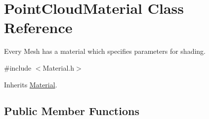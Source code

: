 \hypertarget{class_point_cloud_material}{\section{Point\-Cloud\-Material Class Reference}
\label{class_point_cloud_material}
}


Every Mesh has a material which specifies parameters for shading.  




{\ttfamily \#include $<$Material.\-h$>$}



Inherits \hyperlink{class_material}{Material}.

\subsection*{Public Member Functions}
